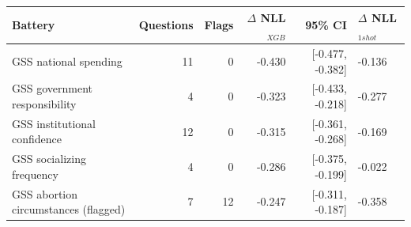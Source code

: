 \begin{tabular}{lrrrrl}\toprule
Battery & Questions & Flags & $\Delta$ NLL$_{XGB}$ & 95\% CI & $\Delta$ NLL$_{1shot}$ \\
\midrule
GSS national spending & 11 & 0 & -0.430 & [-0.477, -0.382] & -0.136 \\
GSS government responsibility & 4 & 0 & -0.323 & [-0.433, -0.218] & -0.277 \\
GSS institutional confidence & 12 & 0 & -0.315 & [-0.361, -0.268] & -0.169 \\
GSS socializing frequency & 4 & 0 & -0.286 & [-0.375, -0.199] & -0.022 \\
GSS abortion circumstances (flagged) & 7 & 12 & -0.247 & [-0.311, -0.187] & -0.358 \\
\bottomrule\end{tabular}
